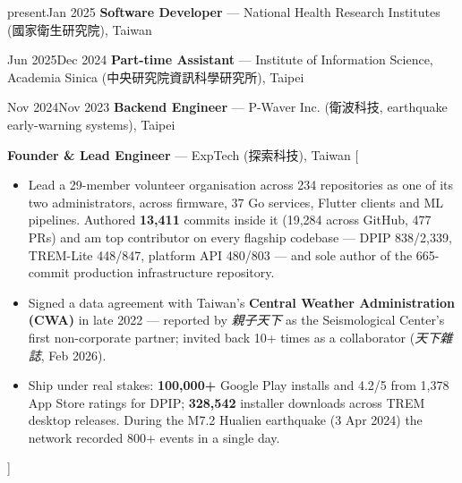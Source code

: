 \documentclass{resume}
\begin{document}
\begin{experiences}
  \experience%
    {present\newline Jan 2025}%
    {\textbf{Software Developer} --- National Health Research Institutes
      (國家衛生研究院), Taiwan}

  \experience%
    {Jun 2025\newline Dec 2024}%
    {\textbf{Part-time Assistant} --- Institute of Information Science,
      Academia Sinica (中央研究院資訊科學研究所), Taipei}

  \experience%
    {Nov 2024\newline Nov 2023}%
    {\textbf{Backend Engineer} --- P-Waver Inc.
      (衛波科技, earthquake early-warning systems), Taipei}

    {\textbf{Founder \& Lead Engineer} --- ExpTech (探索科技), Taiwan}%
    [\begin{itemize}
      \item Lead a 29-member volunteer organisation across 234 repositories as one of its two
        administrators, across firmware, 37 Go services, Flutter clients and ML pipelines. Authored
        \textbf{13,411} commits inside it (19,284 across GitHub, 477 PRs) and am top contributor on every
        flagship codebase --- DPIP 838/2,339, TREM-Lite 448/847, platform API 480/803 --- and sole author
        of the 665-commit production infrastructure repository.
      \item Signed a data agreement with Taiwan's \textbf{Central Weather Administration (CWA)} in late
        2022 --- reported by \emph{親子天下} as the Seismological Center's first non-corporate partner;
        invited back 10+ times as a collaborator (\emph{天下雜誌}, Feb 2026).
      \item Ship under real stakes: \textbf{100,000+} Google Play installs and 4.2/5 from 1,378
        App Store ratings for DPIP; \textbf{328,542} installer downloads across TREM desktop
        releases. During the M7.2 Hualien earthquake (3 Apr 2024) the network recorded
        800+ events in a single day.
    \end{itemize}]
\end{experiences}
\end{document}
